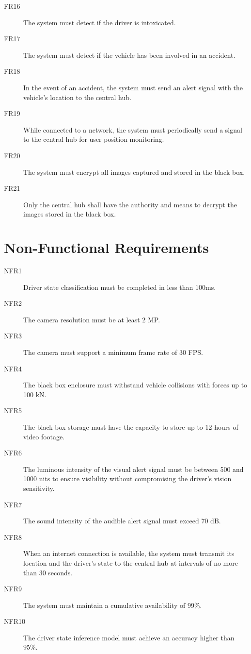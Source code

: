 \begin{description}
    \item[FR16] The system must detect if the driver is intoxicated.
    \item[FR17] The system must detect if the vehicle has been involved in an accident.
    \item[FR18] In the event of an accident, the system must send an alert signal with the vehicle's location to the central hub.
    \item[FR19] While connected to a network, the system must periodically send a signal to the central hub for user position monitoring.
    \item[FR20] The system must encrypt all images captured and stored in the black box.
    \item[FR21] Only the central hub shall have the authority and means to decrypt the images stored in the black box.
\end{description}

\section*{Non-Functional Requirements}

\begin{description}
    \item[NFR1] Driver state classification must be completed in less than 100ms.
    \item[NFR2] The camera resolution must be at least 2 MP.
    \item[NFR3] The camera must support a minimum frame rate of 30 FPS.
    \item[NFR4] The black box enclosure must withstand vehicle collisions with forces up to 100 kN.
    \item[NFR5] The black box storage must have the capacity to store up to 12 hours of video footage.
    \item[NFR6] The luminous intensity of the visual alert signal must be between 500 and 1000 nits to ensure visibility without compromising the driver's vision sensitivity.
    \item[NFR7] The sound intensity of the audible alert signal must exceed 70 dB.
    \item[NFR8] When an internet connection is available, the system must transmit its location and the driver's state to the central hub at intervals of no more than 30 seconds.
    \item[NFR9] The system must maintain a cumulative availability of 99\%.
    \item[NFR10] The driver state inference model must achieve an accuracy higher than 95\%.
\end{description}